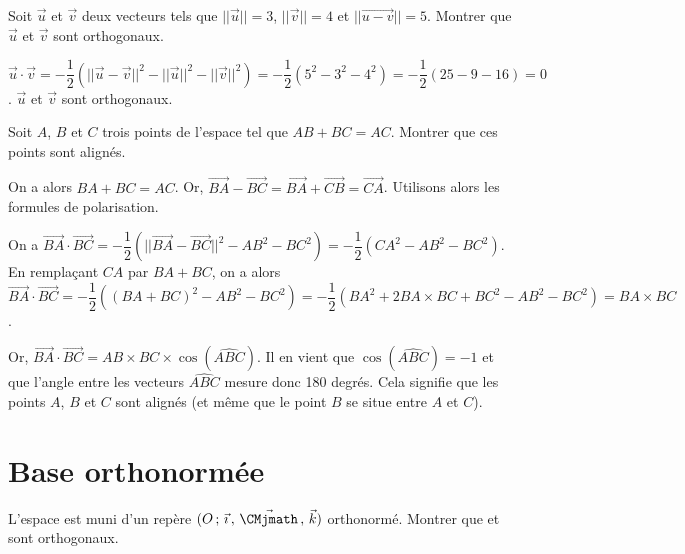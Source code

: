\documentclass[11pt,fleqn, openany]{book} %
\begin{document}
\begin{exercise}Soit $\vec u$ et $\vec v$ deux vecteurs tels que $\lvert\lvert\vec{u}\rvert\rvert=3$, $\lvert\lvert\vec{v}\rvert\rvert=4$ et $\lvert\lvert\vec{u-v}\rvert\rvert=5$. Montrer que $\vec u$ et $\vec v$ sont orthogonaux.\end{exercise}

\begin{solution}$\vec u \cdot \vec v = -\dfrac{1}{2}(\lvert\lvert\vec{u}-\vec{v}\rvert\rvert^2-\lvert\lvert\vec{u}\rvert\rvert^2-\lvert\lvert\vec{v}\rvert\rvert^2)=-\dfrac{1}{2}(5^2-3^2-4^2)=-\dfrac{1}{2}(25-9-16)=0$. $\vec u$ et $\vec v$ sont orthogonaux.\end{solution}




\begin{exercise}Soit $A$, $B$ et $C$ trois points de l'espace tel que $AB+BC=AC$. Montrer que ces points sont alignés.\end{exercise}

\begin{solution}On a alors $BA + BC = AC$. Or, $\overrightarrow{BA}-\overrightarrow{BC}=\overrightarrow{BA}+\overrightarrow{CB}=\overrightarrow{CA}$. Utilisons alors les formules de polarisation.

On a $\overrightarrow{BA}\cdot\overrightarrow{BC}=-\dfrac{1}{2}(\lvert\lvert\overrightarrow{BA}-\overrightarrow{BC}\rvert\rvert^2-AB^2-BC^2)=-\dfrac{1}{2}(CA^2-AB^2-BC^2)$. En remplaçant $CA$ par $BA+BC$, on a alors $\overrightarrow{BA} \cdot \overrightarrow{BC} = -\dfrac{1}{2}((BA+BC)^2-AB^2-BC^2)=-\dfrac{1}{2}(BA^2+2BA \times BC+BC^2-AB^2-BC^2)=BA \times BC$.

Or, $\overrightarrow{BA} \cdot \overrightarrow{BC} = AB \times BC \times \cos (\widehat{ABC})$. Il en vient que $\cos (\widehat{ABC})=-1$ et que l'angle entre les vecteurs $\widehat{ABC}$ mesure donc 180 degrés. Cela signifie que les points $A$, $B$ et $C$ sont alignés (et même que le point $B$ se situe entre $A$ et $C$).\end{solution}


\section*{Base orthonormée}



\begin{exercise}L'espace est muni d'un repère $\Oijk$ orthonormé. Montrer que  et  sont orthogonaux.\end{exercise}
\end{document}
